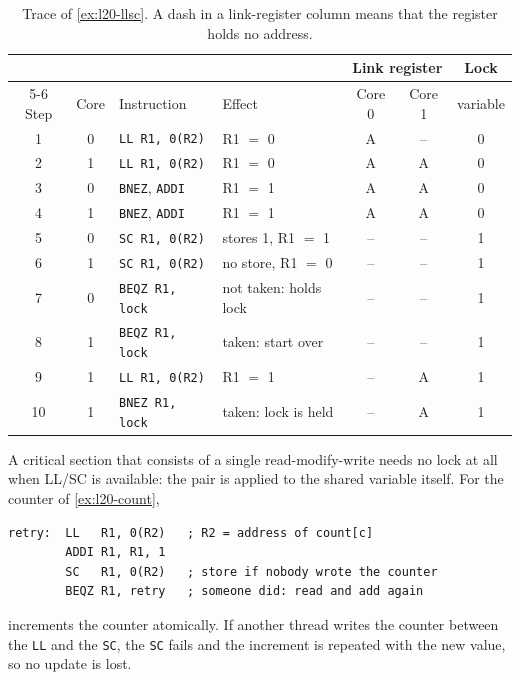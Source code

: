 \documentclass[../main.tex]{subfiles}
\begin{document}
\begin{table}[htbp]
  \centering\small
  \caption{Trace of \cref{ex:l20-llsc}.  A dash in a link-register column
    means that the register holds no address.}
  \label{tab:l20-llsc}
  \begin{tabular}{@{}ccllccc@{}}
    \toprule
    & & & & \multicolumn{2}{c}{Link register} & Lock \\
    \cmidrule(lr){5-6}
    Step & Core & Instruction & Effect & Core 0 & Core 1 & variable \\
    \midrule
    1  & 0 & \texttt{LL R1, 0(R2)}  & R1 $=$ 0                & A  & -- & 0 \\
    2  & 1 & \texttt{LL R1, 0(R2)}  & R1 $=$ 0                & A  & A  & 0 \\
    3  & 0 & \texttt{BNEZ}, \texttt{ADDI} & R1 $=$ 1          & A  & A  & 0 \\
    4  & 1 & \texttt{BNEZ}, \texttt{ADDI} & R1 $=$ 1          & A  & A  & 0 \\
    5  & 0 & \texttt{SC R1, 0(R2)}  & stores 1, R1 $=$ 1      & -- & -- & 1 \\
    6  & 1 & \texttt{SC R1, 0(R2)}  & no store, R1 $=$ 0      & -- & -- & 1 \\
    7  & 0 & \texttt{BEQZ R1, lock} & not taken: holds lock   & -- & -- & 1 \\
    8  & 1 & \texttt{BEQZ R1, lock} & taken: start over       & -- & -- & 1 \\
    9  & 1 & \texttt{LL R1, 0(R2)}  & R1 $=$ 1                & -- & A  & 1 \\
    10 & 1 & \texttt{BNEZ R1, lock} & taken: lock is held     & -- & A  & 1 \\
    \bottomrule
  \end{tabular}
\end{table}

A critical section that consists of a single read-modify-write needs no lock
at all when LL/SC is available: the pair is applied to the shared variable
itself.  For the counter of \cref{ex:l20-count},
\begin{lstlisting}[language={[x86masm]Assembler}, numbers=none]
retry:  LL   R1, 0(R2)   ; R2 = address of count[c]
        ADDI R1, R1, 1
        SC   R1, 0(R2)   ; store if nobody wrote the counter
        BEQZ R1, retry   ; someone did: read and add again
\end{lstlisting}
increments the counter atomically.  If another thread writes the counter
between the \texttt{LL} and the \texttt{SC}, the \texttt{SC} fails and the
increment is repeated with the new value, so no update is lost.
\end{document}
